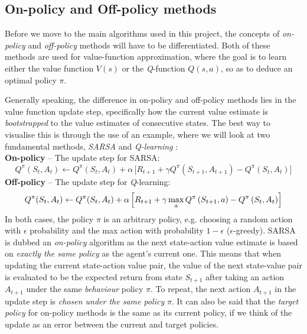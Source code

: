 \subsection{On-policy and Off-policy methods}

Before we move to the main algorithms used in this project, the concepts of \textit{on-policy} and \textit{off-policy} methods will have to be differentiated. 
Both of these methods are used for value-function approximation, where the goal is to learn either the value function $V(s)$ or the \textit{Q}-function $Q(s,a)$, so as to deduce an optimal policy $\pi$.

Generally speaking, the difference in on-policy and off-policy methods lies in the value function update step, specifically how the current value estimate is \textit{bootstrapped} to the value estimates of consecutive states. 
The best way to visualise this is 
through the use of an example, where we will look at two fundamental methods, \textit{SARSA} \cite{suttonAndBartoBook} and \textit{Q-learning} \cite{watkins1992QLearning}: \\[5mm]
\textbf{On-policy} -- The update step for SARSA:
    \begin{equation}
        Q^\pi(S_t, A_t) \leftarrow Q^\pi(S_t, A_t) + \alpha \, \Big[
        R_{t+1} + \gamma Q^\pi(S_{t+1}, A_{t+1}) - Q^\pi(S_t, A_t)
        \Big] \label{3_3_SARSA}
    \end{equation}
\textbf{Off-policy} -- The update step for \textit{Q}-learning:
\begin{equation}
    Q^\pi(S_t, A_t) \leftarrow Q^\pi(S_t, A_t) + \alpha \, \Big[
    R_{t+1} + \gamma \max_a Q^\pi\,(S_{t+1}, a) - Q^\pi\,(S_t, A_t) 
    \Big] \label{3_3_Qlearning} \vspace{1mm}
\end{equation} 
In both cases, the policy $\pi$ is an arbitrary policy, e.g. choosing a random action with $\epsilon$ probability and the max action with probability $1-\epsilon$ ($\epsilon$-greedy).
SARSA is dubbed an \textit{on-policy} algorithm as the next state-action value estimate is based on \textit{exactly the same policy} as the agent's current one. This means that when updating the current state-action value pair, the value of the next state-value pair is evaluated to be the expected return from state $S_{t+1}$ after taking an action $A_{t+1}$ under the same \textit{behaviour} policy $\pi$. To repeat, the next action $A_{t+1}$ in the update step is \textit{chosen under the same policy} $\pi$. It can also be said that the \textit{target policy} for on-policy methods is the same as its current policy, if we think of the update as an error between the current and target policies.

